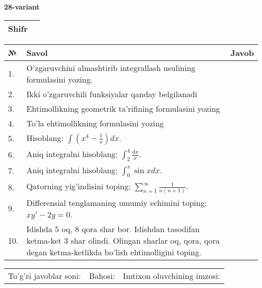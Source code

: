 \documentclass{article}
\begin{document}
  \egroup
  
  \newpage
  
  
  \textbf{28-variant}\\
  
  \bgroup
  \def\arraystretch{1.6} %
  
  \begin{tabular}{|m{5.7cm}|m{9.5cm}|}
  \hline
  Shifr & \\
  \hline
  \end{tabular}
  
  \vspace{1cm}
  
  \begin{tabular}{|m{0.7cm}|m{10cm}|m{4cm}|}
  \hline
  № & Savol & Javob \\
  \hline
  1. & O'zgaruvchini almashtirib integrallash usulining formulasini yozing. &  \\
  \hline
  2. & Ikki o'zgaruvchili funksiyalar qanday belgilanadi &  \\
  \hline
  3. & Ehtimollikning geometrik ta'rifining formulasini yozing &  \\
  \hline
  4. & To'la ehtimollikning formulasini yozing &  \\
  \hline
  5. & Hisoblang: \(\int \left( x^{4} - \frac{1}{x} \right)dx\). &  \\
  \hline
  6. & Aniq integralni hisoblang: \(\int_{2}^{4}\frac{dx}{x}\). &  \\
  \hline
  7. & Aniq integralni hisoblang: \(\int_{0}^{\pi}{\sin xdx}\). &  \\
  \hline
  8. & Qatorning yig'indisini toping: \(\sum_{n = 1}^{\infty}\frac{1}{n(n + 1)}\). &  \\
  \hline
  9. & Differensial tenglamaning umumiy echimini toping: \(xy' - 2y = 0\). &  \\
  \hline
  10. & Idishda 5 oq, 8 qora shar bor. Idishdan tasodifan ketma-ket 3 shar olindi. Olingan sharlar oq, qora, qora degan ketma-ketlikda bo'lish ehtimolligini toping. &  \\
  \hline
  \end{tabular}
  
  \vspace{1cm}
  
  \begin{tabular}{lll}
  To'g'ri javoblar soni: \underline{\hspace{1.5cm}} & 
  Bahosi: \underline{\hspace{1.5cm}} & 
  Imtixon oluvchining imzosi: \underline{\hspace{2cm}} \\
  \end{tabular}
  
\end{document}
